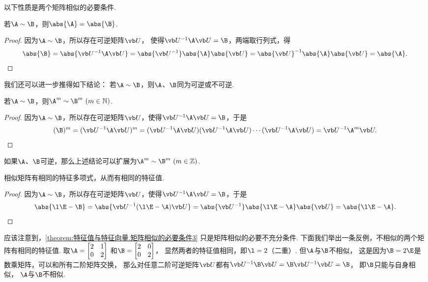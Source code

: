 以下性质是两个矩阵相似的必要条件.
\begin{property}\label{theorem:特征值与特征向量.矩阵相似的必要条件1}
若\(\A\sim\B\)，则\(\abs{\A}=\abs{\B}\).
\begin{proof}
因为\(\A\sim\B\)，所以存在可逆矩阵\(\P\)，
使得\(\P^{-1}\A\P=\B\)，两端取行列式，得\[
	\abs{\B} = \abs{\P^{-1}\A\P}
	= \abs{\P^{-1}}\abs{\A}\abs{\P}
	= \abs{\P}^{-1}\abs{\A}\abs{\P}
	= \abs{\A}.
	\qedhere
\]
\end{proof}
\end{property}
我们还可以进一步推得如下结论：
若\(\A\sim\B\)，则\(\A\)、\(\B\)同为可逆或不可逆.

\begin{property}\label{theorem:特征值与特征向量.矩阵相似的必要条件2}
若\(\A\sim\B\)，则\(\A^m \sim \B^m\ (m\in\mathbb{N})\).
\begin{proof}
因为\(\A\sim\B\)，所以存在可逆矩阵\(\P\)，使得\(\P^{-1}\A\P=\B\)，于是\[
	(\B)^m = (\P^{-1}\A\P)^m
	= (\P^{-1}\A\P)(\P^{-1}\A\P)\dotsb(\P^{-1}\A\P)
	= \P^{-1}\A^m\P.
	\qedhere
\]
\end{proof}
\end{property}
如果\(\A\)、\(\B\)可逆，那么上述结论可以扩展为\(\A^m\sim\B^m\ (m\in\mathbb{Z})\).

\begin{property}\label{theorem:特征值与特征向量.矩阵相似的必要条件3}
相似矩阵有相同的特征多项式，从而有相同的特征值.
\begin{proof}
因为\(\A\sim\B\)，所以存在可逆矩阵\(\P\)，使得\(\P^{-1}\A\P=\B\)，于是\[
	\abs{\l\E-\B}
	=\abs{\P^{-1}(\l\E-\A)\P}
	=\abs{\P^{-1}}\abs{\l\E-\A}\abs{\P}
	=\abs{\l\E-\A}.
	\qedhere
\]
\end{proof}
\end{property}

应该注意到，\cref{theorem:特征值与特征向量.矩阵相似的必要条件3} 只是矩阵相似的必要不充分条件.
下面我们举出一条反例，不相似的两个矩阵有相同的特征值.
取\(\A=\begin{bmatrix} 2 & 1 \\ 0 & 2 \end{bmatrix}\)
和\(\B=\begin{bmatrix} 2 & 0 \\ 0 & 2 \end{bmatrix}\)，
显然两者的特征值相同，即\(\l=2\)（二重）.
但\(\A\)与\(\B\)不相似，
这是因为\(\B=2\E\)是数乘矩阵，可以和所有二阶矩阵交换，
那么对任意二阶可逆矩阵\(\P\)都有\(\P^{-1}\B\P=\B\P^{-1}\P=\B\)，
即\(\B\)只能与自身相似，
\(\A\)与\(\B\)不相似.

